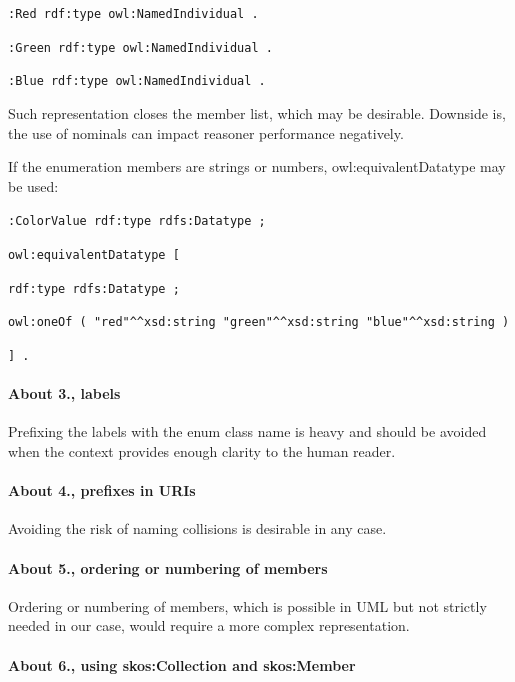 \documentclass[
  11pt,
]{article}
\begin{document}
\texttt{:Red\ rdf:type\ owl:NamedIndividual\ .}

\texttt{:Green\ rdf:type\ owl:NamedIndividual\ .}

\texttt{:Blue\ rdf:type\ owl:NamedIndividual\ .}

Such representation closes the member list, which may be desirable.
Downside is, the use of nominals can impact reasoner performance
negatively.

If the enumeration members are strings or numbers,
owl:equivalentDatatype may be used:

\texttt{:ColorValue\ rdf:type\ rdfs:Datatype\ ;}

\texttt{owl:equivalentDatatype\ {[}}

\texttt{rdf:type\ rdfs:Datatype\ ;}

\texttt{owl:oneOf\ (\ "red"\^{}\^{}xsd:string\ "green"\^{}\^{}xsd:string\ "blue"\^{}\^{}xsd:string\ )}

\texttt{{]}\ .}

\hypertarget{about-3.-labels}{%
\paragraph{About 3., labels}\label{about-3.-labels}}

Prefixing the labels with the enum class name is heavy and should be
avoided when the context provides enough clarity to the human reader.

\hypertarget{about-4.-prefixes-in-uris}{%
\paragraph{About 4., prefixes in URIs}\label{about-4.-prefixes-in-uris}}

Avoiding the risk of naming collisions is desirable in any case.

\hypertarget{about-5.-ordering-or-numbering-of-members}{%
\paragraph{About 5., ordering or numbering of
members}\label{about-5.-ordering-or-numbering-of-members}}

Ordering or numbering of members, which is possible in UML but not
strictly needed in our case, would require a more complex
representation.

\hypertarget{about-6.-using-skoscollection-and-skosmember}{%
\paragraph{About 6., using skos:Collection and
skos:Member}\label{about-6.-using-skoscollection-and-skosmember}}
\end{document}
